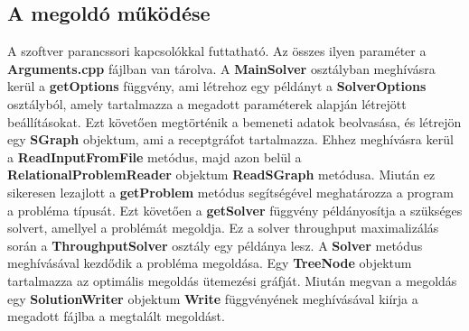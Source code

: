 \subsection{A megoldó működése}
A szoftver parancssori kapcsolókkal futtatható. Az összes ilyen paraméter a \textbf{Arguments.cpp} fájlban van tárolva. A \textbf{MainSolver} osztályban meghívásra kerül a \textbf{getOptions} függvény, ami létrehoz egy példányt a \textbf{SolverOptions} osztályból, amely tartalmazza a megadott paraméterek alapján létrejött beállításokat. Ezt követően megtörténik a bemeneti adatok beolvasása, és létrejön egy \textbf{SGraph} objektum, ami a receptgráfot tartalmazza. Ehhez meghívásra kerül a \textbf{ReadInputFromFile} metódus, majd azon belül a \textbf{RelationalProblemReader} objektum \textbf{ReadSGraph} metódusa. Miután ez sikeresen lezajlott a \textbf{getProblem} metódus segítségével meghatározza a program a probléma típusát. Ezt követően a \textbf{getSolver} függvény példányosítja a szükséges solvert, amellyel a problémát megoldja. Ez a solver throughput maximalizálás során a \textbf{ThroughputSolver} osztály egy példánya lesz. A \textbf{Solver} metódus meghívásával kezdődik a probléma megoldása. Egy \textbf{TreeNode} objektum tartalmazza az optimális megoldás ütemezési gráfját. Miután megvan a megoldás egy \textbf{SolutionWriter} objektum \textbf{Write} függvényének meghívásával kiírja a megadott fájlba a megtalált megoldást.

